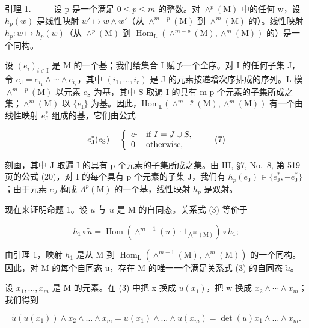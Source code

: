引理 1. —— 设 p 是一个满足 \(0 \leqslant p \leqslant m\) 的整数。对 \(\wedge^{p}(\mathrm{M})\) 中的任何 w，设 \(h_{p}(w)\) 是线性映射 \(w' \mapsto w \wedge w'\)（从 \(\wedge^{m-p}(\mathrm{M})\) 到 \(\wedge^{m}(\mathrm{M})\) 的）。线性映射 \(h_{p}: w \mapsto h_{p}(w)\)（从 \(\wedge^{p}(\mathrm{M})\) 到 \(\operatorname{Hom}_{\mathrm{L}}(\wedge^{m-p}(\mathrm{M}), \wedge^{m}(\mathrm{M}))\) 的）是一个同构。

设 \((e_{i})_{i\in\mathrm{I}}\) 是 M 的一个基；我们给集合 I 赋予一个全序。对 I 的任何子集 J，令 \(e_{\mathrm{J}}=e_{i_{1}}\wedge\cdots\wedge e_{i_{r}}\)，其中 \((i_{1},\ldots,i_{r})\) 是 J 的元素按递增次序排成的序列。L-模 \(\wedge^{m-p}(\mathrm{M})\) 以元素 \(e_{\mathrm{S}}\) 为基，其中 S 取遍 I 的具有 m-p 个元素的子集所成之集；\(\wedge^{m}(\mathrm{M})\) 以 \(\{e_{\mathrm{I}}\}\) 为基。因此，\(\mathrm{Hom}_{\mathrm{L}}(\wedge^{m-p}(\mathrm{M}),\wedge^{m}(\mathrm{M}))\) 有一个由线性映射 \(e_{\mathrm{J}}^{*}\) 组成的基，它们由公式

\[
e _ {\mathrm{J}} ^ {*} (e _ {\mathrm{S}}) = \left\{ \begin{array}{l l} e _ {\mathrm{I}} & \text {if } I = J\cup S, \\ 0 & \text {otherwise}, \end{array} \right.\tag{7}
\]

刻画，其中 J 取遍 I 的具有 p 个元素的子集所成之集。由 III, §7, No.~8, 第 519 页的公式 (20)，对 I 的每个具有 p 个元素的子集 J，我们有 \(h_{p}(e_{\mathrm{J}}) \in \{e_{\mathrm{J}}^{*}, -e_{\mathrm{J}}^{*}\}\)；由于元素 \(e_{J}\) 构成 \(\Lambda^{p}(\mathrm{M})\) 的一个基，线性映射 \(h_{p}\) 是双射。

现在来证明命题 1。设 \(u\) 与 \(\widetilde{u}\) 是 M 的自同态。关系式 (3) 等价于

\[
h _ {1} \circ \widetilde {u} = \operatorname{Hom} (\wedge^ {m - 1} (u) \cdot 1 _ {\bigwedge^ {m} (\mathrm{M})}) \circ h _ {1};\tag{8}
\]

由引理 1，映射 \(h_{1}\) 是从 M 到 \(\operatorname{Hom}_{\mathrm{L}}(\wedge^{m-1}(\mathrm{M}),\wedge^{m}(\mathrm{M}))\) 的一个同构。因此，对 M 的每个自同态 u，存在 M 的唯一一个满足关系式 (3) 的自同态 \(\widetilde{u}\)。

设 \(x_{1},\ldots,x_{m}\) 是 M 的元素。在 (3) 中把 x 换成 \(u(x_{1})\)，把 w 换成 \(x_{2}\wedge\cdots\wedge x_{m}\)；我们得到

\[
\widetilde {u} (u (x _ {1})) \wedge x _ {2} \wedge \dots \wedge x _ {m} = u (x _ {1}) \wedge \dots \wedge u (x _ {m}) = \det (u) x _ {1} \wedge \dots \wedge x _ {m}.
\]

